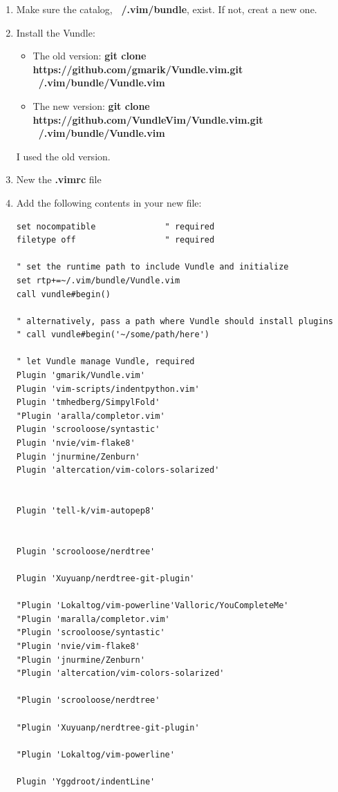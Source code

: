 \documentclass{article}
\begin{document}
\begin{enumerate}


\item Make sure the catalog, \textbf{~/.vim/bundle}, exist. If not, creat a new one.

\item Install the Vundle:

\begin{itemize}
\item \textnormal{The old version:} \bf {git clone https://github.com/gmarik/Vundle.vim.git ~/.vim/bundle/Vundle.vim}
\item \textnormal{The new version:} \bf {git clone https://github.com/VundleVim/Vundle.vim.git ~/.vim/bundle/Vundle.vim}
\end{itemize}
I used the old version.


\item New the \textbf{.vimrc} file


\item Add the following contents in your new file:
\begin{lstlisting}
set nocompatible              " required
filetype off                  " required

" set the runtime path to include Vundle and initialize
set rtp+=~/.vim/bundle/Vundle.vim
call vundle#begin()

" alternatively, pass a path where Vundle should install plugins
" call vundle#begin('~/some/path/here')

" let Vundle manage Vundle, required
Plugin 'gmarik/Vundle.vim'
Plugin 'vim-scripts/indentpython.vim'
Plugin 'tmhedberg/SimpylFold'
"Plugin 'aralla/completor.vim'
Plugin 'scrooloose/syntastic'
Plugin 'nvie/vim-flake8'
Plugin 'jnurmine/Zenburn'
Plugin 'altercation/vim-colors-solarized'


Plugin 'tell-k/vim-autopep8'


Plugin 'scrooloose/nerdtree'

Plugin 'Xuyuanp/nerdtree-git-plugin'

"Plugin 'Lokaltog/vim-powerline'Valloric/YouCompleteMe'
"Plugin 'maralla/completor.vim'
"Plugin 'scrooloose/syntastic'
"Plugin 'nvie/vim-flake8'
"Plugin 'jnurmine/Zenburn'
"Plugin 'altercation/vim-colors-solarized'

"Plugin 'scrooloose/nerdtree'

"Plugin 'Xuyuanp/nerdtree-git-plugin'

"Plugin 'Lokaltog/vim-powerline'

Plugin 'Yggdroot/indentLine'



\end{lstlisting}
\end{enumerate}
\end{document}

